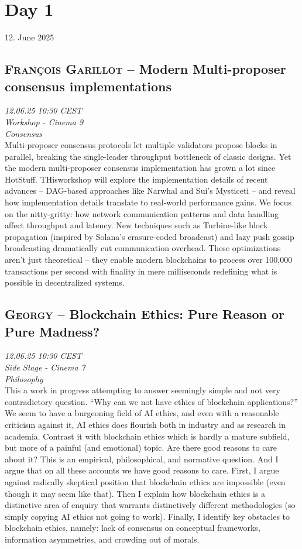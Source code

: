 
\section {Day 1} 12. June 2025\cleardoublepage
\subsection {\textsc{François  Garillot}  -- Modern Multi-proposer consensus implementations} \noindent \textit {12.06.25 10:30 CEST\\ Workshop - Cinema 9\\ Consensus}\\[1em] Multi-proposer consensus protocols let multiple validators propose blocks in parallel, breaking the single-leader throughput bottleneck of classic designs. Yet the modern multi-proposer consensus implementation has grown a lot since HotStuff. THisworkshop will explore the implementation details of recent advances – DAG-based approaches like Narwhal and Sui’s Mysticeti – and reveal how implementation details translate to real-world performance gains. We focus on the nitty-gritty: how network communication patterns and data handling affect throughput and latency. New techniques such as Turbine-like block propagation (inspired by Solana’s erasure-coded broadcast) and lazy push gossip broadcasting dramatically cut communication overhead. These optimizations aren’t just theoretical – they enable modern blockchains to process over 100,000 transactions per second with finality in mere milliseconds​ redefining what is possible in decentralized systems.

\clearpage
\subsection {\textsc{Georgy}  -- Blockchain Ethics: Pure Reason or Pure Madness?} \noindent \textit {12.06.25 10:30 CEST\\ Side Stage - Cinema 7\\ Philosophy}\\[1em] This a work in progress attempting to answer seemingly simple and not very contradictory question.  ``Why can we not have ethics of blockchain applications?'' We seem to have a burgeoning field of AI ethics, and even with a reasonable criticism against it, AI ethics does flourish both in industry and as research in academia. Contrast it with blockchain ethics which is hardly a mature subfield, but more of a painful (and emotional) topic. Are there good reasons to care about it? This is an empirical, philosophical, and normative question. And I argue that on all these accounts we have good reasons to care. First, I argue against radically skeptical position that blockchain ethics are impossible (even though it may seem like that). Then I explain how blockchain ethics is a distinctive area of enquiry that warrants distinctively different methodologies (so simply copying AI ethics not going to work). Finally, I identify key obstacles to blockchain ethics, namely: lack of consensus on conceptual frameworks, information asymmetries, and crowding out of morals.


